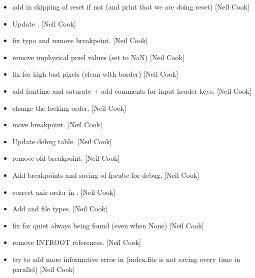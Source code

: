 \documentclass[a4paper,10pt,english]{report}
\begin{document}
\begin{itemize}
\item {} 
 \sphinxhyphen{} add in skipping of reset if
not  (and print that we are doing reset) {[}Neil Cook{]}

\item {} 
Update . {[}Neil Cook{]}

\item {} 
  \sphinxhyphen{} fix typo and remove breakpoint.
{[}Neil Cook{]}

\item {} 
 \sphinxhyphen{} remove unphysical pixel values (set to NaN)
{[}Neil Cook{]}

\item {} 
 \sphinxhyphen{} fix for high bad pixels (clean with border) {[}Neil
Cook{]}

\item {} 
 \sphinxhyphen{} add frmtime and saturate +
add comments for input header keys. {[}Neil Cook{]}

\item {} 
 \sphinxhyphen{} change the locking order. {[}Neil Cook{]}

\item {} 
 \sphinxhyphen{} move breakpoint. {[}Neil Cook{]}

\item {} 
Update debug table. {[}Neil Cook{]}

\item {} 
 \sphinxhyphen{} remove old breakpoint. {[}Neil Cook{]}

\item {} 
Add breakpoints and saving of fpcube for debug. {[}Neil Cook{]}

\item {} 
 \sphinxhyphen{} correct axis order in . {[}Neil
Cook{]}

\item {} 
Add  and  file types. {[}Neil Cook{]}

\item {} 
 \sphinxhyphen{} fix for quiet always being found (even when
None) {[}Neil Cook{]}

\item {} 
 \sphinxhyphen{} remove INTROOT references.
{[}Neil Cook{]}

\item {} 
 \sphinxhyphen{} try to add more informative error in 
(index.fits is not saving every time in parallel) {[}Neil Cook{]}

\end{itemize}
\end{document}
